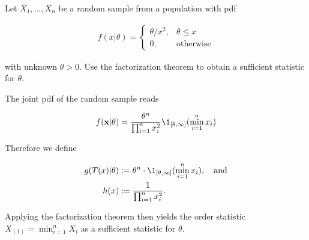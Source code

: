 
\begin{exercise}

Let $X_1,\dots,X_n$ be a random sample from a population with pdf

\begin{align*}
    f(x|\theta) = \begin{cases}
        \theta/x^2, & \theta \leq x \\
        0, & \text{otherwise}
    \end{cases}
\end{align*}

with unknown $\theta > 0$. Use the factorization theorem to obtain 
a sufficient statistic for $\theta$.
\end{exercise}


\begin{solution}

The joint pdf of the random sample reads

\begin{align*}
    f(\textbf{x}| \theta) = \frac{\theta^n}{\prod_{i=1}^n x_i^2}\1_{[\theta,\infty]}(\min_{i=1}^n x_i)
\end{align*}

Therefore we define 

\begin{align*}
    g(T(x)|\theta) &:= \theta^n \cdot \1_{[\theta,\infty]}(\min_{i=1}^n x_i), \quad  \text{and}\\
    h(x) &:= \frac{1}{\prod_{i=1}^n x_i^2}.
\end{align*}

Applying the factorization theorem then yields the order statistic 
$X_{(1)} = \min_{i=1}^n X_i$ as a sufficient statistic for $\theta$.


\end{solution}

